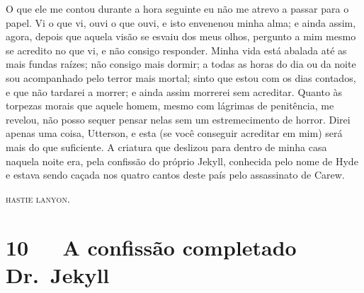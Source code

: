 O que ele me contou durante a hora seguinte eu não me atrevo a passar
para o papel.  Vi o que vi, ouvi o que ouvi, e isto envenenou minha
alma; e ainda assim, agora, depois que aquela visão se esvaiu dos meus
olhos, pergunto a mim mesmo se acredito no que vi, e não consigo
responder.  Minha vida está abalada até as mais fundas raízes; não
consigo mais dormir; a todas as horas do dia ou da noite sou
acompanhado pelo terror mais mortal; sinto que estou com os dias
contados, e que não tardarei a morrer; e ainda assim morrerei sem
acreditar.  Quanto às torpezas morais que aquele homem, mesmo com
lágrimas de penitência, me revelou, não posso sequer pensar nelas sem
um estremecimento de horror.  Direi apenas uma coisa, Utterson, e esta
(se você conseguir acreditar em mim) será mais do que suficiente.  A
criatura que deslizou para dentro de minha casa naquela noite era, pela
confissão do próprio Jekyll, conhecida pelo nome de Hyde e estava sendo
caçada nos quatro cantos deste país pelo assassinato de Carew.

\textsc{hastie lanyon}.


\chapter[10\ \ \ A confissão completa do Dr.~Jekyll]{10\ \ \ A confissão completa\break do Dr.~Jekyll}

